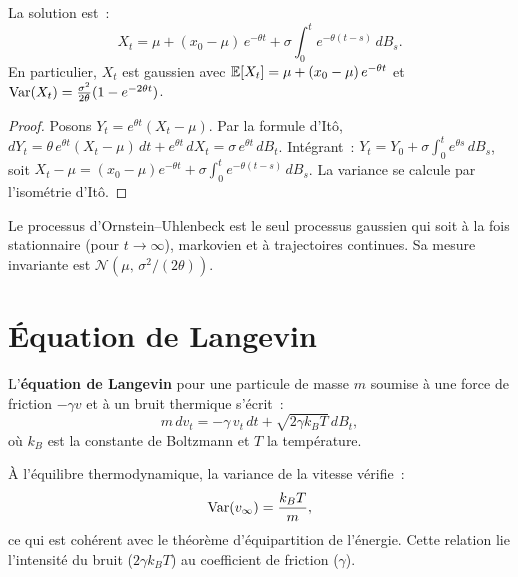 \begin{proposition}
La solution est~:
\[
  X_t = \mu + (x_0 - \mu)\,e^{-\theta t}
    + \sigma \int_0^t e^{-\theta(t-s)}\,dB_s.
\]
En particulier, $X_t$ est gaussien avec
$\mathbb{E}[X_t] = \mu + (x_0 - \mu)\,e^{-\theta t}$ et
$\mathrm{Var}(X_t) = \frac{\sigma^2}{2\theta}(1 - e^{-2\theta t})$.
\end{proposition}

\begin{proof}
Posons $Y_t = e^{\theta t}(X_t - \mu)$. Par la formule d'It\^o,
$dY_t = \theta\,e^{\theta t}(X_t - \mu)\,dt + e^{\theta t}\,dX_t
= \sigma\,e^{\theta t}\,dB_t$.
Int\'egrant~: $Y_t = Y_0 + \sigma\int_0^t e^{\theta s}\,dB_s$,
soit $X_t - \mu = (x_0 - \mu)e^{-\theta t}
+ \sigma\int_0^t e^{-\theta(t-s)}\,dB_s$.
La variance se calcule par l'isom\'etrie d'It\^o.
\end{proof}

\begin{remarque}
Le processus d'Ornstein--Uhlenbeck est le seul processus gaussien
qui soit \`a la fois stationnaire (pour $t \to \infty$), markovien et
\`a trajectoires continues. Sa mesure invariante est
$\mathcal{N}(\mu,\, \sigma^2/(2\theta))$.
\end{remarque}

\section{\'Equation de Langevin}
\label{sec:langevin}

\begin{definition}
L'\textbf{\'equation de Langevin} pour une particule de
masse $m$ soumise \`a une force de friction $-\gamma v$ et \`a un bruit
thermique s'\'ecrit~:
\[
  m\,dv_t = -\gamma\,v_t\,dt + \sqrt{2\gamma k_B T}\,dB_t,
\]
o\`u $k_B$ est la constante de Boltzmann et $T$ la temp\'erature.
\end{definition}

\begin{proposition}
\`A l'\'equilibre thermodynamique, la variance de la vitesse v\'erifie~:
\[
  \mathrm{Var}(v_\infty) = \frac{k_B T}{m},
\]
ce qui est coh\'erent avec le th\'eor\`eme d'\'equipartition de l'\'energie.
Cette relation lie l'intensit\'e du bruit ($2\gamma k_B T$) au
coefficient de friction ($\gamma$).
\end{proposition}

